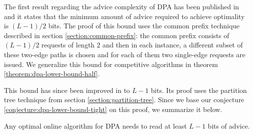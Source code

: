The first result regarding the advice complexity of DPA has been published
in \cite{komm-thesis} and it states that the minimum amount of advice
required to achieve optimality is $(L-1)/2$ bits. The proof of this bound
uses the common prefix technique described in section
\ref{section:common-prefix}: the common prefix consists of $(L-1)/2$
requests of length $2$ and then in each instance, a different subset of
these two-edge paths is chosen and for each of them two single-edge
requests are issued. We generalize this bound for competitive algorithms
in theorem \ref{theorem:dpa-lower-bound-half}.


This bound has since been improved in \cite{sofsem2014} to $L-1$ bits. Its
proof uses the partition tree technique from section
\ref{section:partition-tree}. Since we base our conjecture
\ref{conjecture:dpa-lower-bound-tight} on this proof, we summarize it
below.

\begin{theorem}\label{theorem:dpa-lower-optimal}
    Any optimal online algorithm for DPA needs to read at least $L-1$ bits
    of advice.
\end{theorem}

